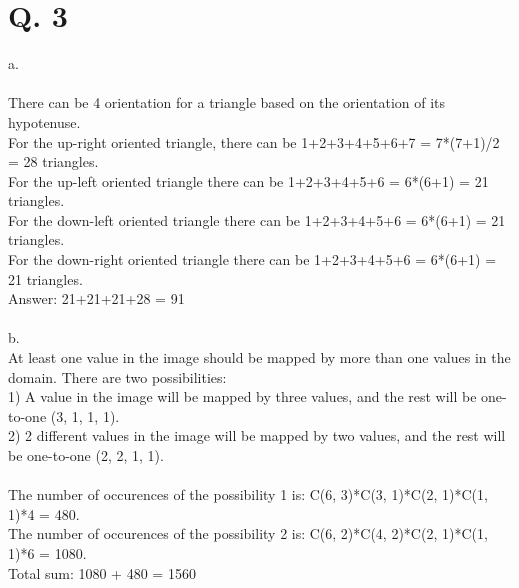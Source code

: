 \documentclass[10pt]{article}
\begin{document}
\section*{Q. 3}
a.\\\\
There can be 4 orientation for a triangle based on the orientation of its hypotenuse.\\For the up-right oriented triangle, there can be 1+2+3+4+5+6+7 = 7*(7+1)/2 = 28 triangles.\\For the up-left oriented triangle there can be 1+2+3+4+5+6 = 6*(6+1) = 21 triangles.\\For the down-left oriented triangle there can be 1+2+3+4+5+6 = 6*(6+1) = 21 triangles.\\For the down-right oriented triangle there can be 1+2+3+4+5+6 = 6*(6+1) = 21 triangles.\\
Answer: 21+21+21+28 = 91\\\\b.\\At least one value in the image should be mapped by more than one values in the domain. There are two possibilities:\\1) A value in the image will be mapped by three values, and the rest will be one-to-one (3, 1, 1, 1).\\2) 2 different values in the image will be mapped by two values, and the rest will be one-to-one (2, 2, 1, 1).\\\\ The number of occurences of the possibility 1 is: C(6, 3)*C(3, 1)*C(2, 1)*C(1, 1)*4 = 480.\\ The number of occurences of the possibility 2 is: C(6, 2)*C(4, 2)*C(2, 1)*C(1, 1)*6 = 1080.\\Total sum: 1080 + 480 = 1560
\end{document}
